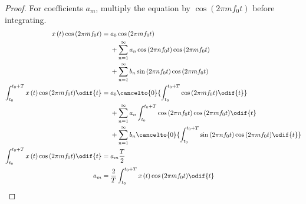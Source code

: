 \documentclass{article}
\begin{document}
\begin{proof}
    For coefficients \(a_m\), multiply the equation by \(\cos{\left( 2 \pi m f_0 t \right)}\) before integrating.
    \begin{align*}
        x\left( t \right) \cos{\left( 2 \pi m f_0 t \right)}                               & = \begin{aligned}[t]
                                                                                                    & a_0 \cos{\left( 2 \pi m f_0 t \right)}                                                          \\
                                                                                                    & + \sum_{n = 1}^\infty a_n \cos{\left( 2 \pi n f_0 t \right)} \cos{\left( 2 \pi m f_0 t \right)} \\
                                                                                                    & + \sum_{n = 1}^\infty b_n \sin{\left( 2 \pi n f_0 t \right)} \cos{\left( 2 \pi m f_0 t \right)}
                                                                                               \end{aligned}                                                    \\
        \int_{t_0}^{t_0 + T} x\left( t \right) \cos{\left( 2 \pi m f_0 t \right)} \odif{t} & = \begin{aligned}[t]
                                                                                                    & a_0 \cancelto{0}{\int_{t_0}^{t_0 + T} \cos{\left( 2 \pi m f_0 t \right)} \odif{t}}                                                          \\
                                                                                                    & + \sum_{n = 1}^\infty a_n \int_{t_0}^{t_0 + T} \cos{\left( 2 \pi n f_0 t \right)} \cos{\left( 2 \pi m f_0 t \right)} \odif{t}               \\
                                                                                                    & + \sum_{n = 1}^\infty b_n \cancelto{0}{\int_{t_0}^{t_0 + T} \sin{\left( 2 \pi n f_0 t \right)} \cos{\left( 2 \pi m f_0 t \right)} \odif{t}}
                                                                                               \end{aligned} \\
        \int_{t_0}^{t_0 + T} x\left( t \right) \cos{\left( 2 \pi m f_0 t \right)} \odif{t} & = a_m \frac{T}{2}                                                                                                                                       \\
        a_m                                                                                & = \frac{2}{T} \int_{t_0}^{t_0 + T} x\left( t \right) \cos{\left( 2 \pi m f_0 t \right)} \odif{t}
    \end{align*}


\end{proof}
\end{document}
